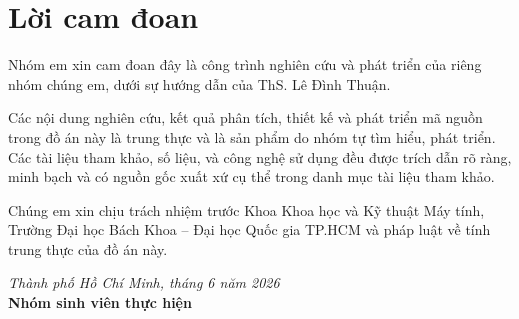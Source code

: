\section*{Lời cam đoan}
{}
Nhóm em xin cam đoan đây là công trình nghiên cứu và phát triển của riêng nhóm chúng em, dưới sự hướng dẫn của ThS. Lê Đình Thuận.

Các nội dung nghiên cứu, kết quả phân tích, thiết kế và phát triển mã nguồn trong đồ án này là trung thực và là sản phẩm do nhóm tự tìm hiểu, phát triển. Các tài liệu tham khảo, số liệu, và công nghệ sử dụng đều được trích dẫn rõ ràng, minh bạch và có nguồn gốc xuất xứ cụ thể trong danh mục tài liệu tham khảo.

Chúng em xin chịu trách nhiệm trước Khoa Khoa học và Kỹ thuật Máy tính, Trường Đại học Bách Khoa -- Đại học Quốc gia TP.HCM và pháp luật về tính trung thực của đồ án này.

\vspace{1cm}
\begin{flushright}
\textit{Thành phố Hồ Chí Minh, tháng 6 năm 2026} \\
\textbf{Nhóm sinh viên thực hiện}
\end{flushright}
